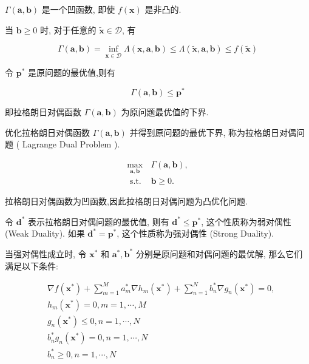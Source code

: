 \documentclass[10pt]{article}
\begin{document}
$\Gamma(\boldsymbol{a}, \boldsymbol{b})$ 是一个凹函数, 即使 $f(\boldsymbol{x})$ 是非凸的.

当 $\boldsymbol{b} \geq 0$ 时, 对于任意的 $\tilde{\boldsymbol{x}} \in \mathcal{D}$, 有


\begin{equation*}
\Gamma(\boldsymbol{a}, \boldsymbol{b})=\inf _{\boldsymbol{x} \in \mathcal{D}} \Lambda(\boldsymbol{x}, \boldsymbol{a}, \boldsymbol{b}) \leq \Lambda(\tilde{\boldsymbol{x}}, \boldsymbol{a}, \boldsymbol{b}) \leq f(\tilde{\boldsymbol{x}}) \tag{C.19}
\end{equation*}


令 $\boldsymbol{p}^{*}$ 是原问题的最优值,则有


\begin{equation*}
\Gamma(\boldsymbol{a}, \boldsymbol{b}) \leq \boldsymbol{p}^{*} \tag{C.20}
\end{equation*}


即拉格朗日对偶函数 $\Gamma(\boldsymbol{a}, \boldsymbol{b})$ 为原问题最优值的下界.

优化拉格朗日对偶函数 $\Gamma(\boldsymbol{a}, \boldsymbol{b})$ 并得到原问题的最优下界, 称为拉格朗日对偶问题 ( Lagrange Dual Problem ).


\begin{align*}
\max _{\boldsymbol{a}, \boldsymbol{b}} & \Gamma(\boldsymbol{a}, \boldsymbol{b}),  \tag{C.21}\\
\text { s.t. } & \boldsymbol{b} \geq 0 . \tag{C.22}
\end{align*}


拉格朗日对偶函数为凹函数,因此拉格朗日对偶问题为凸优化问题.

令 $\boldsymbol{d}^{*}$ 表示拉格朗日对偶问题的最优值, 则有 $\boldsymbol{d}^{*} \leq \boldsymbol{p}^{*}$, 这个性质称为弱对偶性 (Weak Duality). 如果 $\boldsymbol{d}^{*}=\boldsymbol{p}^{*}$, 这个性质称为强对偶性 (Strong Duality).

当强对偶性成立时, 令 $\boldsymbol{x}^{*}$ 和 $\boldsymbol{a}^{*}, \boldsymbol{b}^{*}$ 分别是原问题和对偶问题的最优解, 那么它们满足以下条件:


\begin{align*}
& \nabla f\left(\boldsymbol{x}^{*}\right)+\sum_{m=1}^{M} a_{m}^{*} \nabla h_{m}\left(\boldsymbol{x}^{*}\right)+\sum_{n=1}^{N} b_{n}^{*} \nabla g_{n}\left(\boldsymbol{x}^{*}\right)=0,  \tag{C.23}\\
& h_{m}\left(\boldsymbol{x}^{*}\right)=0, m=1, \cdots, M  \tag{C.24}\\
& g_{n}\left(\boldsymbol{x}^{*}\right) \leq 0, n=1, \cdots, N  \tag{C.25}\\
& b_{n}^{*} g_{n}\left(\boldsymbol{x}^{*}\right)=0, n=1, \cdots, N  \tag{C.26}\\
& b_{n}^{*} \geq 0, n=1, \cdots, N \tag{C.27}
\end{align*}
\end{document}
